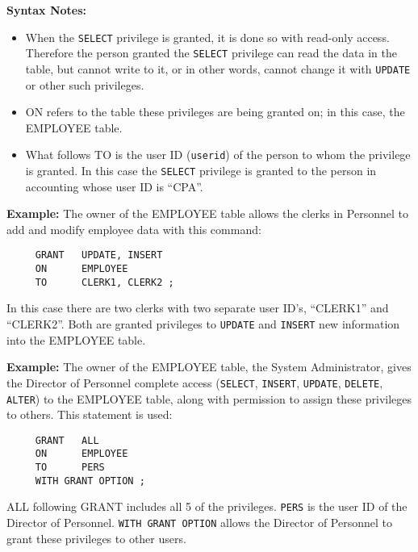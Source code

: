 %

{\bf Syntax Notes:}
\begin{itemize}
\item When the \verb`SELECT` privilege is granted, it is done so with
read-only access.  Therefore the person granted the \verb`SELECT` privilege
can read the data in the table, but cannot write to it, or in other
words, cannot change it with \verb`UPDATE` or other such privileges.

\item ON refers to the table these privileges are being granted on; in
this case, the EMPLOYEE table.

\item What follows TO is the user ID (\verb`userid`) of the person to
whom the privilege is granted.  In this case the \verb`SELECT` privilege is
granted to the person in accounting whose user ID is ``CPA''.
\end{itemize}

{\bf Example:}
The owner of the EMPLOYEE table allows the clerks in Personnel to add
and modify employee data with this command:

\begin{verbatim}
     GRANT   UPDATE, INSERT
     ON      EMPLOYEE
     TO      CLERK1, CLERK2 ;
\end{verbatim}

In this case there are two clerks with two separate user ID's,
``CLERK1'' and ``CLERK2''.  Both are granted privileges to \verb`UPDATE` and
\verb`INSERT` new information into the EMPLOYEE table.

{\bf Example:}
The owner of the EMPLOYEE table, the System Administrator, gives the
Director of Personnel complete access (\verb`SELECT`, \verb`INSERT`, \verb`UPDATE`, \verb`DELETE`,
\verb`ALTER`) to the EMPLOYEE table, along with permission to assign these
privileges to others.  This statement is used:

\begin{verbatim}
     GRANT   ALL
     ON      EMPLOYEE
     TO      PERS
     WITH GRANT OPTION ;
\end{verbatim}

ALL following GRANT includes all 5 of the privileges.  {\tt PERS} is the
user ID of the Director of Personnel.  {\tt WITH GRANT OPTION} allows the
Director of Personnel to grant these privileges to other users.

